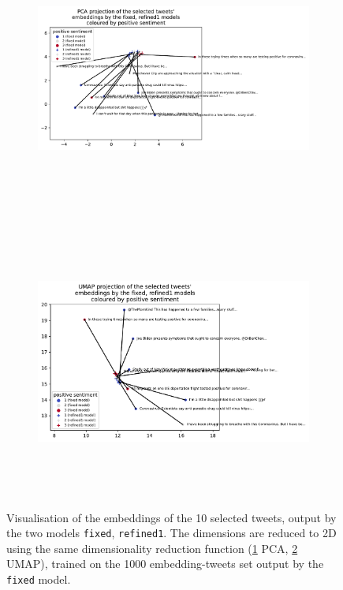 \begin{figure}
    \centering
    \begin{subfigure}[t]{\textwidth}
        \hspace*{1.5cm}\includegraphics[height=9cm]{images/transformer_embedding2models_pca_positive.pdf}
        \caption{}\label{fig:p2t-2models-embedding-pca}
    \end{subfigure}
    \begin{subfigure}[t]{\textwidth}
        \hspace*{1.5cm}\includegraphics[height=9cm]{images/transformer_embedding2models_umap_positive.pdf}
        \caption{}\label{fig:p2t-2models-embedding-umap}
    \end{subfigure}
    \caption{Visualisation of the embeddings of the 10 selected tweets, output by the two models \texttt{fixed}, \texttt{refined1}. The dimensions are reduced to 2D using the same dimensionality reduction function (\cref{fig:p2t-2models-embedding-pca} PCA, \cref{fig:p2t-2models-embedding-umap} UMAP), trained on the 1000 embedding-tweets set output by the \texttt{fixed} model.}
    \label{fig:p2t-2models-embedding}
\end{figure}

